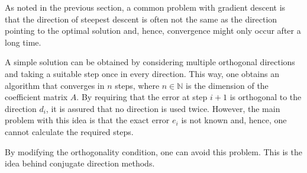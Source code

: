     As noted in the previous section, a common problem with gradient descent is that the direction of steepest descent is often not the same as the direction pointing to the optimal solution and, hence, convergence might only occur after a long time.

    A simple solution can be obtained by considering multiple orthogonal directions and taking a suitable step once in every direction. This way, one obtains an algorithm that converges in $n$ steps, where $n\in\mathbb{N}$ is the dimension of the coefficient matrix $A$. By requiring that the error at step $i+1$ is orthogonal to the direction $d_i$, it is assured that no direction is used twice. However, the main problem with this idea is that the exact error $e_i$ is not known and, hence, one cannot calculate the required steps.

    By modifying the orthogonality condition, one can avoid this problem. This is the idea behind conjugate direction methods.

